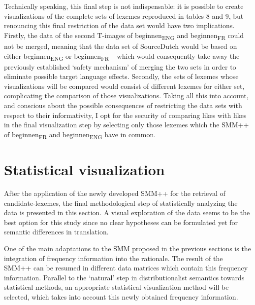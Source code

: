 Technically speaking, this final step is not indispensable: it is possible to create visualizations of the complete sets of lexemes reproduced in tables 8 and 9, but renouncing this final restriction of the data set would have two implications. Firstly, the data of the second T-images of beginnen\textsubscript{ENG} and beginnen\textsubscript{FR} could not be merged, meaning that the data set of SourceDutch would be based on either beginnen\textsubscript{ENG} or beginnen\textsubscript{FR} – which would consequently take away the previously established ‘safety mechanism’ of merging the two sets in order to eliminate possible target language effects. Secondly, the sets of lexemes whose visualizations will be compared would consist of different lexemes for either set, complicating the comparison of those visualizations. Taking all this into account, and conscious about the possible consequences of restricting the data sets with respect to their informativity, I opt for the security of comparing likes with likes in the final visualization step by selecting only those lexemes which the SMM++ of beginnen\textsubscript{FR} and beginnen\textsubscript{ENG} have in common.


\section{Statistical visualization}
\label{sec:3.7}  
After the application of the newly developed SMM++ for the retrieval of candidate-lexemes, the final methodological step of statistically analyzing the data is presented in this section. A visual exploration of the data seems to be the best option for this study since no clear hypotheses can be formulated yet for semantic differences in translation.

One of the main adaptations to the SMM proposed in the previous sections is the integration of frequency information into the rationale. The result of the SMM++ can be resumed in different data matrices which contain this frequency information. Parallel to the ‘natural’ step in distributionalist semantics towards statistical methods, an appropriate statistical visualization method will be selected, which takes into account this newly obtained frequency information.

